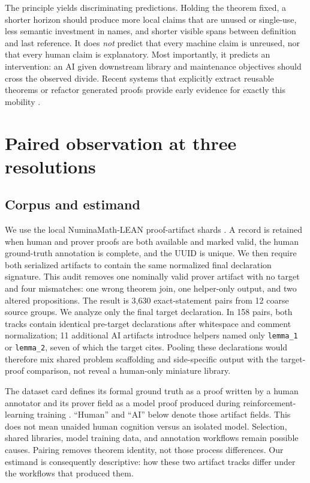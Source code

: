\documentclass[10pt]{article}
\newcommand{\code}[1]{\texttt{#1}}
\begin{document}
The principle yields discriminating predictions.  Holding the theorem fixed, a shorter horizon
should produce more local claims that are unused or single-use, less semantic investment in names,
and shorter visible spans between definition and last reference.  It does \emph{not} predict that
every machine claim is unreused, nor that every human claim is explanatory.  Most importantly, it
predicts an intervention: an AI given downstream library and maintenance objectives should cross
the observed divide.  Recent systems that explicitly extract reusable theorems or refactor
generated proofs provide early evidence for exactly this mobility \citep{zhou2024,fu2026refactor,
lu2026leanrefactor,lyu2026rtl2lean}.

\section{Paired observation at three resolutions}

\subsection{Corpus and estimand}

We use the local NuminaMath-LEAN proof-artifact shards \citep{numinamathlean}.  A record is retained when human and prover
proofs are both available and marked valid, the human ground-truth annotation is complete, and the
UUID is unique.  We then require both serialized artifacts to contain the same normalized final
declaration signature.  This audit removes one nominally valid prover artifact with no target and
four mismatches: one wrong theorem join, one helper-only output, and two altered propositions.  The
result is 3,630 exact-statement pairs from 12 coarse source groups.  We analyze only the final target
declaration.  In 158 pairs, both tracks contain identical pre-target declarations after whitespace
and comment normalization; 11 additional AI artifacts introduce helpers named only
\code{lemma\_1} or \code{lemma\_2}, seven of which the target cites.  Pooling these
declarations would therefore mix shared problem scaffolding and side-specific output with the
target-proof comparison, not reveal a human-only miniature library.

The dataset card defines its formal ground truth as a proof written by a human annotator and its
prover field as a model proof produced during reinforcement-learning training \citep{numinamathlean}.
``Human'' and ``AI'' below denote those artifact fields.  This does
not mean unaided human cognition versus an isolated model.  Selection, shared libraries, model
training data, and annotation workflows remain possible causes.  Pairing removes theorem identity,
not those process differences.  Our estimand is consequently descriptive: how these two artifact
tracks differ under the workflows that produced them.
\end{document}
